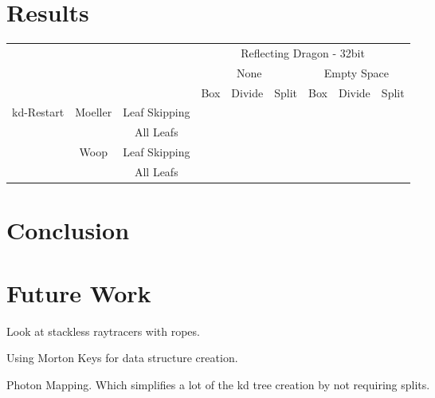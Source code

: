 \chapter{Results}





\begin{tabular}{ r  c  c | c | c | c | c | c | c |}
  &&& \multicolumn{6}{|c|}{Reflecting Dragon - 32bit} \\
  \cline{4-9}
  &&& \multicolumn{3}{|c|}{None} & \multicolumn{3}{|c|}{Empty Space} \\
  \cline{4-9}
  &&& Box & Divide & Split & Box & Divide & Split \\
  \hline
  \multirow{4}{*}{kd-Restart} & \multirow{2}{*}{Moeller} & Leaf Skipping & \\
  && All Leafs & \\
  \cline{2-8}
  & \multirow{2}{*}{Woop} & Leaf Skipping & \\
  && All Leafs & \\
  \hline
\end{tabular}

\chapter{Conclusion}


\chapter{Future Work}


Look at stackless raytracers with ropes.

Using Morton Keys for data structure creation.

Photon Mapping. Which simplifies a lot of the kd tree creation by not
requiring splits.
